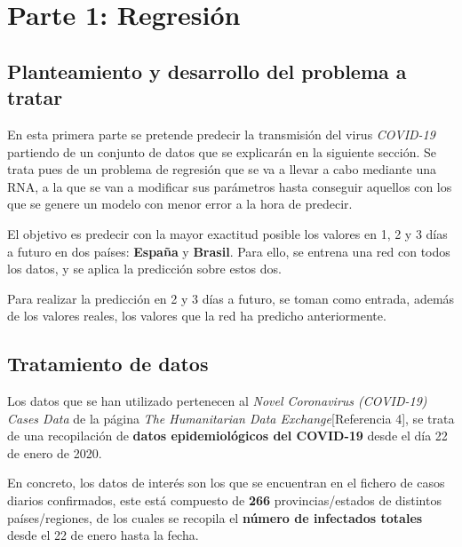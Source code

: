 \documentclass[12pt,a4paper, xcolor=table]{article}
\begin{document}
\newpage


\section{Parte 1: Regresión}

    \subsection{Planteamiento y desarrollo del problema a tratar}

    En esta primera parte se pretende predecir la transmisión del virus \textit{COVID-19} partiendo de un conjunto de datos que se explicarán en la siguiente sección. Se trata pues de un problema de regresión que se va a llevar a cabo mediante una RNA, a la que se van a modificar sus parámetros hasta conseguir aquellos con los que se genere un modelo con menor error a la hora de predecir.

    \vspace{2mm}

    El objetivo es predecir con la mayor exactitud posible los valores en 1, 2 y 3 días a futuro en dos países: \textbf{España} y \textbf{Brasil}. Para ello, se entrena una red con todos los datos, y se aplica la predicción sobre estos dos.

    \vspace{2mm}

    Para realizar la predicción en 2 y 3 días a futuro, se toman como entrada, además de los valores reales, los valores que la red ha predicho anteriormente.




    \subsection{Tratamiento de datos}

    Los datos que se han utilizado pertenecen al \textit{Novel Coronavirus (COVID-19) Cases Data} de la página \textit{The Humanitarian Data Exchange}[Referencia 4], se trata de una recopilación de \textbf{datos epidemiológicos del COVID-19} desde el día 22 de enero de 2020.

    \vspace{3mm}

    En concreto, los datos de interés son los que se encuentran en el fichero de casos diarios confirmados, este está compuesto de \textbf{266} provincias/estados de distintos países/regiones, de los cuales se recopila el \textbf{número de infectados totales} desde el 22 de enero hasta la fecha.
\end{document}
